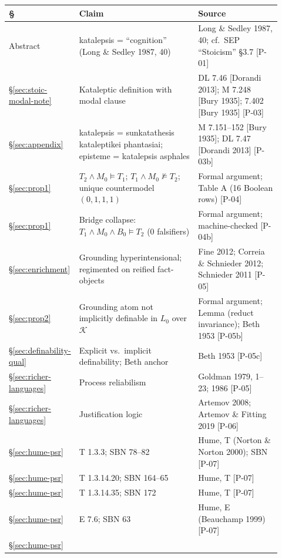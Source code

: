 \documentclass[11pt]{article}
\theoremstyle{plain}
\theoremstyle{definition}
\theoremstyle{remark}
\begin{document}
\begin{center}
\begin{longtable}{p{0.14\linewidth} p{0.46\linewidth} >{\raggedright\arraybackslash}p{0.32\linewidth}}
\hline
\textbf{\S} & \textbf{Claim} & \textbf{Source} \\
\hline
Abstract &
katalepsis = ``cognition'' (Long \& Sedley 1987, 40) &
Long \& Sedley 1987, 40; cf.\ SEP ``Stoicism'' \S3.7 [P-01] \\
\hline
\S\ref{sec:stoic-modal-note} &
Kataleptic definition with modal clause &
DL 7.46 [Dorandi 2013]; M 7.248 [Bury 1935]; 7.402 [Bury 1935]
[P-03] \\
\hline
\S\ref{sec:appendix} &
katalepsis = sunkatathesis kataleptikei phantasiai; episteme =
katalepsis asphales &
M 7.151--152 [Bury 1935]; DL 7.47 [Dorandi 2013] [P-03b] \\
\hline
\S\ref{sec:prop1} &
$T_2\land M_0\models T_1$; $T_1\land M_0\not\models T_2$; unique
countermodel $(0,1,1,1)$ &
Formal argument; Table A (16 Boolean rows) [P-04] \\
\hline
\S\ref{sec:prop1} &
Bridge collapse: $T_1\land M_0\land B_0\models T_2$ (0 falsifiers) &
Formal argument; machine-checked [P-04b] \\
\hline
\S\ref{sec:enrichment} &
Grounding hyperintensional; regimented on reified fact-objects &
Fine 2012; Correia \& Schnieder 2012; Schnieder 2011 [P-05] \\
\hline
\S\ref{sec:prop2} &
Grounding atom not implicitly definable in $L_0$ over $\mathcal K$ &
Formal argument; Lemma (reduct invariance); Beth 1953 [P-05b] \\
\hline
\S\ref{sec:definability-qual} &
Explicit vs.\ implicit definability; Beth anchor& Beth 1953 [P-05c] \\
\hline
\S\ref{sec:richer-languages} &
Process reliabilism &
Goldman 1979, 1--23; 1986 [P-05] \\
\hline
\S\ref{sec:richer-languages} &
Justification logic &
Artemov 2008; Artemov \& Fitting 2019 [P-06] \\
\hline
\S\ref{sec:hume-psr} &
T 1.3.3; SBN 78--82 &
Hume, T (Norton \& Norton 2000); SBN [P-07] \\
\hline
\S\ref{sec:hume-psr} &
T 1.3.14.20; SBN 164--65 &
Hume, T [P-07] \\
\hline
\S\ref{sec:hume-psr} &
T 1.3.14.35; SBN 172 &
Hume, T [P-07] \\
\hline
\S\ref{sec:hume-psr} &
E 7.6; SBN 63 &
Hume, E (Beauchamp 1999) [P-07] \\
\hline
\S\ref{sec:hume-psr} &

\end{longtable}
\end{center}
\end{document}
